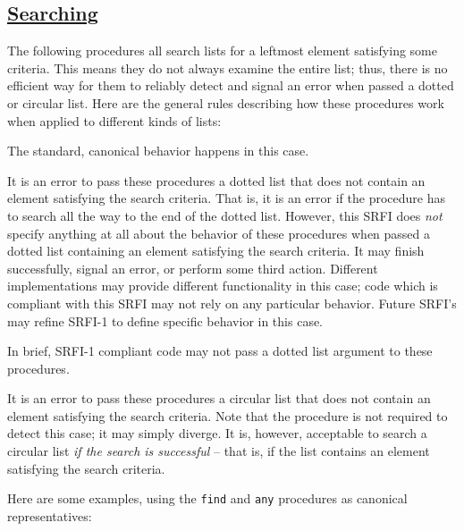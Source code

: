 \subsection{\texorpdfstring{\href{}{Searching}}{Searching}}\label{searching}

The following procedures all search lists for a leftmost element
satisfying some criteria. This means they do not always examine the
entire list; thus, there is no efficient way for them to reliably detect
and signal an error when passed a dotted or circular list. Here are the
general rules describing how these procedures work when applied to
different kinds of lists:

\begin{description}
\tightlist
\item[ Proper lists: ]
The standard, canonical behavior happens in this case.
\item[ Dotted lists: ]
It is an error to pass these procedures a dotted list that does not
contain an element satisfying the search criteria. That is, it is an
error if the procedure has to search all the way to the end of the
dotted list. However, this SRFI does \emph{not} specify anything at all
about the behavior of these procedures when passed a dotted list
containing an element satisfying the search criteria. It may finish
successfully, signal an error, or perform some third action. Different
implementations may provide different functionality in this case; code
which is compliant with this SRFI may not rely on any particular
behavior. Future SRFI's may refine SRFI-1 to define specific behavior in
this case.

In brief, SRFI-1 compliant code may not pass a dotted list argument to
these procedures.
\item[ Circular lists: ]
It is an error to pass these procedures a circular list that does not
contain an element satisfying the search criteria. Note that the
procedure is not required to detect this case; it may simply diverge. It
is, however, acceptable to search a circular list \emph{if the search is
successful} -- that is, if the list contains an element satisfying the
search criteria.
\end{description}

Here are some examples, using the \texttt{find} and \texttt{any}
procedures as canonical representatives:

